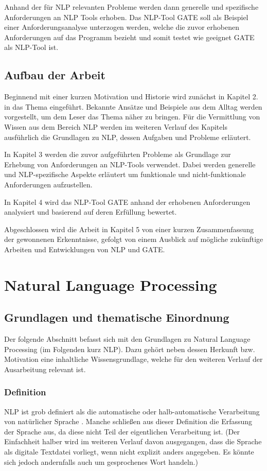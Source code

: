 \documentclass[12pt]{report}
\begin{document}
Anhand der für NLP relevanten Probleme werden dann generelle und spezifische Anforderungen an NLP Tools erhoben. 
Das NLP-Tool GATE soll als Beispiel einer Anforderungsanalyse unterzogen werden, welche die zuvor erhobenen Anforderungen auf das Programm bezieht und somit testet wie geeignet GATE als NLP-Tool ist.

\section{Aufbau der Arbeit}
Beginnend mit einer kurzen Motivation und Historie wird zunächst in Kapitel 2. in das Thema eingeführt. Bekannte Ansätze und Beispiele aus dem Alltag werden vorgestellt, um dem Leser das Thema näher zu bringen. Für die Vermittlung von Wissen aus dem Bereich NLP werden im weiteren Verlauf des Kapitels ausführlich die Grundlagen zu NLP, dessen Aufgaben und Probleme erläutert.

In Kapitel 3 werden die zuvor aufgeführten Probleme als Grundlage zur Erhebung von Anforderungen an NLP-Tools verwendet. Dabei werden generelle und NLP-spezifische Aspekte erläutert um funktionale und nicht-funktionale Anforderungen aufzustellen.

In Kapitel 4 wird das NLP-Tool GATE anhand der erhobenen Anforderungen analysiert und basierend auf deren Erfüllung bewertet. 

Abgeschlossen wird die Arbeit in Kapitel 5 von einer kurzen Zusammenfassung der gewonnenen Erkenntnisse, gefolgt von einem Ausblick auf mögliche zukünftige Arbeiten und Entwicklungen von NLP und GATE. 

\chapter{Natural Language Processing}
\section{Grundlagen und thematische Einordnung}
Der folgende Abschnitt befasst sich mit den Grundlagen zu Natural Language Processing (im Folgenden kurz NLP). Dazu gehört neben dessen Herkunft bzw. Motivation eine inhaltliche Wissensgrundlage, welche für den weiteren Verlauf der Ausarbeitung relevant ist. 

\subsection{Definition}
NLP ist grob definiert als die automatische oder halb-automatische Verarbeitung von natürlicher Sprache \cite{cop04}. Manche schließen aus dieser Definition die Erfassung der Sprache aus, da diese nicht Teil der eigentlichen Verarbeitung ist. (Der Einfachheit halber wird im weiteren Verlauf davon ausgegangen, dass die Sprache als digitale Textdatei vorliegt, wenn nicht explizit anders angegeben. Es könnte sich jedoch andernfalls auch um gesprochenes Wort handeln.)
\end{document}
